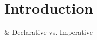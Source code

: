%
%
%

\section{Introduction}
	\label{sec:introduction}
\begin{easylist}

& Declarative vs. Imperative


\end{easylist}
\clearpage